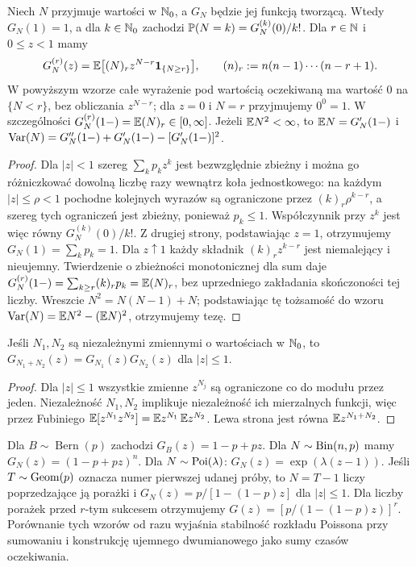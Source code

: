 \begin{twierdzenie}
Niech $N$ przyjmuje wartości w $\mathbb{N}_0$, a $G_N$ będzie jej
funkcją tworzącą. Wtedy $G_N(1)=1$, a dla $k\in\mathbb{N}_0$
zachodzi $\mathbb{P}(N=k)=G_N^{(k)}(0)/k!$.
Dla $r\in\mathbb{N}$ i $0\leq z<1$ mamy
\[
G_N^{(r)}(z)=\mathbb{E}\bigl[(N)_r z^{N-r}\mathbf{1}_{\{N\geq r\}}\bigr],
\qquad (n)_r:=n(n-1)\cdots(n-r+1).
\]
W powyższym wzorze całe wyrażenie pod wartością oczekiwaną
ma wartość $0$ na $\{N<r\}$, bez obliczania $z^{N-r}$;
dla $z=0$ i $N=r$ przyjmujemy $0^0=1$.
W szczególności $G_N^{(r)}(1-)=\mathbb{E}(N)_r\in[0,\infty]$.
Jeżeli $\mathbb{E} N^2<\infty$, to
$\mathbb{E} N=G_N'(1-)$ i
$\operatorname{Var}(N)=G_N''(1-)+G_N'(1-)-[G_N'(1-)]^2$.
\end{twierdzenie}
\begin{proof}
Dla $|z|<1$ szereg $\sum_k p_kz^k$ jest bezwzględnie
zbieżny i można go różniczkować dowolną liczbę razy
wewnątrz koła jednostkowego: na każdym $|z|\leq\rho<1$
pochodne kolejnych wyrazów są ograniczone przez
$(k)_r\rho^{k-r}$, a szereg tych ograniczeń jest zbieżny,
ponieważ $p_k\leq1$. Współczynnik przy $z^k$ jest więc
równy $G_N^{(k)}(0)/k!$. Z drugiej strony, podstawiając
$z=1$, otrzymujemy $G_N(1)=\sum_kp_k=1$.
Dla $z\uparrow1$ każdy składnik $(k)_rz^{k-r}$ jest
niemalejący i nieujemny. Twierdzenie o zbieżności
monotonicznej dla sum daje
$G_N^{(r)}(1-)=\sum_{k\geq r}(k)_rp_k=\mathbb{E}(N)_r$,
bez uprzedniego zakładania skończoności tej liczby.
Wreszcie $N^2=N(N-1)+N$; podstawiając tę tożsamość
do wzoru $\operatorname{Var}(N)=\mathbb{E} N^2-(\mathbb{E} N)^2$, otrzymujemy tezę.
\end{proof}

\begin{twierdzenie}
Jeśli $N_1,N_2$ są niezależnymi zmiennymi o wartościach
w $\mathbb{N}_0$, to $G_{N_1+N_2}(z)=G_{N_1}(z)G_{N_2}(z)$
dla $|z|\leq1$.
\end{twierdzenie}
\begin{proof}
Dla $|z|\leq1$ wszystkie zmienne $z^{N_j}$ są ograniczone
co do modułu przez jeden. Niezależność $N_1,N_2$ implikuje
niezależność ich mierzalnych funkcji, więc przez Fubiniego
$\mathbb{E}[z^{N_1}z^{N_2}]=\mathbb{E} z^{N_1}\,\mathbb{E} z^{N_2}$.
Lewa strona jest równa $\mathbb{E} z^{N_1+N_2}$.
\end{proof}

\begin{przyklad}
Dla $B\sim\operatorname{Bern}(p)$ zachodzi
$G_B(z)=1-p+pz$. Dla $N\sim\operatorname{Bin}(n,p)$ mamy
$G_N(z)=(1-p+pz)^n$. Dla $N\sim\operatorname{Poi}(\lambda)$:
$G_N(z)=\exp(\lambda(z-1))$.
Jeśli $T\sim\operatorname{Geom}(p)$ oznacza numer pierwszej udanej próby,
to $N=T-1$ liczy poprzedzające ją porażki i
$G_N(z)=p/[1-(1-p)z]$ dla $|z|\leq1$.
Dla liczby porażek przed $r$-tym sukcesem otrzymujemy
$G(z)=[p/(1-(1-p)z)]^r$.
Porównanie tych wzorów od razu wyjaśnia stabilność
rozkładu Poissona przy sumowaniu i konstrukcję
ujemnego dwumianowego jako sumy czasów oczekiwania.
\end{przyklad}

